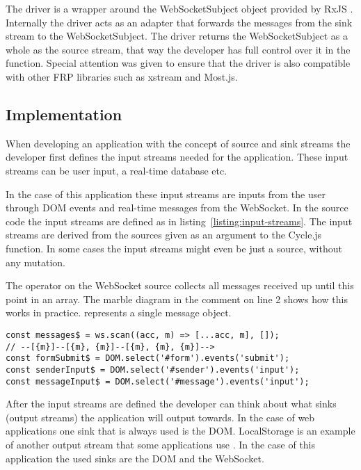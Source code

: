 The driver is a wrapper around the WebSocketSubject object provided by RxJS \cite{ws-subject}. Internally the driver acts as an adapter that forwards the messages from the sink stream to the WebSocketSubject. The driver returns the WebSocketSubject as a whole as the source stream, that way the developer has full control over it in the  function. Special attention was given to ensure that the driver is also compatible with other FRP libraries such as xstream and Most.js.

\subsection{Implementation}

When developing an application with the concept of source and sink streams the developer first defines the input streams needed for the application. These input streams can be user input, a real-time database etc.

In the case of this application these input streams are inputs from the user through DOM events and real-time messages from the WebSocket. In the source code the input streams are defined as in listing~\ref{listing:input-streams}. The input streams are derived from the sources given as an argument to the Cycle.js  function. In some cases the input streams might even be just a source, without any mutation.

The  operator on the WebSocket source collects all messages received up until this point in an array. The marble diagram in the comment on line 2 shows how this works in practice.  represents a single message object.

\begin{lstlisting}[caption=Definition and instantiation of the input streams,label=listing:input-streams]
const messages$ = ws.scan((acc, m) => [...acc, m], []);
// --[{m}]--[{m}, {m}]--[{m}, {m}, {m}]-->
const formSubmit$ = DOM.select('#form').events('submit');
const senderInput$ = DOM.select('#sender').events('input');
const messageInput$ = DOM.select('#message').events('input');
\end{lstlisting}

After the input streams are defined the developer can think about what sinks (output streams) the application will output towards. In the case of web applications one sink that is always used is the DOM. LocalStorage is an example of another output stream that some applications use \cite{local-storage}. In the case of this application the used sinks are the DOM and the WebSocket.

